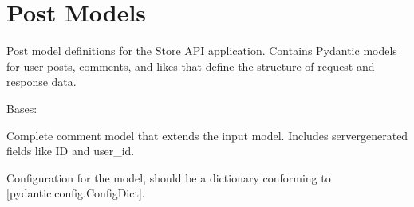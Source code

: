 \documentclass[letterpaper,10pt,openany,oneside,english]{sphinxmanual}
\begin{document}
\section{Post Models}
\label{\detokenize{modules/models:post-models}}
\sphinxAtStartPar
Post model definitions for the Store API application.
Contains Pydantic models for user posts, comments, and likes
that define the structure of request and response data.


\begin{savenotes}\begin{fulllineitems}

\pysigstartsignatures
{}
\pysigstopsignatures
\sphinxAtStartPar
Bases: 

\sphinxAtStartPar
Complete comment model that extends the input model.
Includes server\sphinxhyphen{}generated fields like ID and user\_id.


\begin{savenotes}\begin{fulllineitems}

\pysigstartsignatures
{}
\pysigstopsignatures
\end{fulllineitems}\end{savenotes}



\begin{savenotes}\begin{fulllineitems}

\pysigstartsignatures
{}
\pysigstopsignatures
\sphinxAtStartPar
Configuration for the model, should be a dictionary conforming to {[}\sphinxtitleref{ConfigDict}{]}{[}pydantic.config.ConfigDict{]}.


\end{fulllineitems}
\end{savenotes}
\end{fulllineitems}
\end{savenotes}
\end{document}
